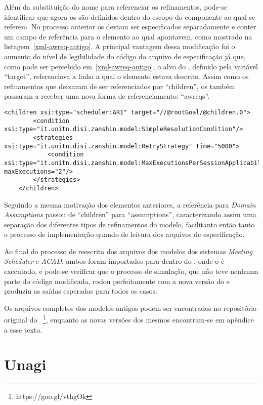Além da substituição do nome para referenciar os refinamentos, pode-se identificar que agora os \awreqs são definidos dentro do escopo do componente ao qual se referem. No processo anterior os \awreqs deviam ser especificados separadamente e conter um campo de referência para o elemento ao qual apontavem, como mostrado na listagem~\ref{xml-awreq-antigo}. A principal vantagem dessa modificação foi o aumento do nível de legibilidade do código do arquivo de especificação já que, como pode ser percebido em~\ref{xml-awreq-antigo}, o alvo do \awreq, definido pela variável ``target'', referenciava a linha a qual o elemento estava descrito. Assim como os refinamentos que deixaram de ser referenciados por ``children'', os \awreqs também passaram a receber uma nova forma de referenciamento: ``awreqs''.
 
\begin{lstlisting}[caption={Trecho de XML representando o ACAD no novo metamodelo},label={xml-refinements}]
	<children xsi:type="scheduler:AR1" target="//@rootGoal/@children.0">
		<condition xsi:type="it.unitn.disi.zanshin.model:SimpleResolutionCondition"/>
		<strategies xsi:type="it.unitn.disi.zanshin.model:RetryStrategy" time="5000">
			<condition xsi:type="it.unitn.disi.zanshin.model:MaxExecutionsPerSessionApplicabilityCondition" maxExecutions="2"/>
		</strategies>
	</children>
\end{lstlisting}

Seguindo a mesma motivação dos elementos anteriores, a referência para \textit{Domain Assumptions} passou de ``children'' para ``assumptions'', caracterizando assim uma separação dos diferentes tipos de refinamentos do modelo, facilitanto então tanto o processo de implementação quando de leitura dos arquivos de especificação. 

Ao final do processo de reescrita dos arquivos dos modelos dos sistemas \textit{Meeting Scheduler} e \textit{ACAD}, ambos foram importados para dentro do \eclipse, onde o \zanshin é executado, e pode-se verificar que o processo de simulação, que não teve nenhuma parte do código modificada, rodou perfeitamente com a nova versão do \zanshin e produziu as saídas esperadas para todos os casos.

Os arquivos completos dos modelos antigos podem ser encontrados no repositório original do \framework~\footnote{https://goo.gl/vthgOk}, enquanto as novas versões dos mesmos encontram-se em apêndice a esse texto.

\section{Unagi}

